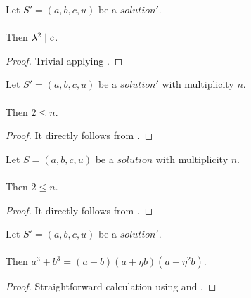 \begin{lemma}
    \label{lmm:lambda_pow_two_dvd_c}
    \leanok
    Let $S'=(a, b, c, u)$ be a $solution'$. \\\\
    Then $\lambda^2 \mid c$.
\end{lemma}
\begin{proof}
    \leanok
    Trivial applying .
\end{proof}

\begin{lemma}
    \label{lmm:Solution1_two_le_multiplicity}
    \leanok
    Let $S'=(a, b, c, u)$ be a $solution'$ with multiplicity $n$.\\\\
    Then $2 \leq n$.
\end{lemma}
\begin{proof}
    \leanok
    It directly follows from .
\end{proof}

\begin{lemma}
    \label{lmm:Solution_two_le_multiplicity}
    \leanok
    Let $S=(a, b, c, u)$ be a $solution$ with multiplicity $n$.\\\\
    Then $2 \leq n$.
\end{lemma}
\begin{proof}
    \leanok
    It directly follows from .
\end{proof}

\begin{lemma}
    \label{lmm:cube_add_cube_eq_mul}
    \leanok
    Let $S'=(a, b, c, u)$ be a $solution'$.\\\\
    Then $a^3 + b^3 = (a + b) (a + \eta b)  (a + \eta^2 b)$.
\end{lemma}
\begin{proof}
    \leanok
    Straightforward calculation using 
    and .
\end{proof}

